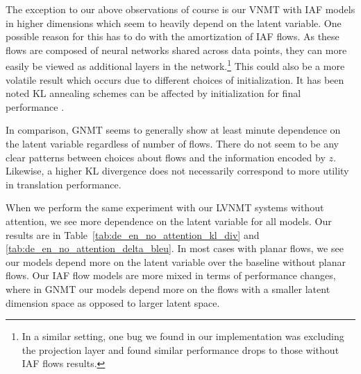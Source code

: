 The exception to our above observations of course is our \ac{VNMT} with \ac{IAF} models in higher dimensions which seem to heavily depend on the latent variable. One possible reason for this has to do with the amortization of \ac{IAF} flows. As these flows are composed of neural networks shared across data points, they can more easily be viewed as additional layers in the network.\footnote{In a similar setting, one bug we found in our implementation was excluding the projection layer and found similar performance drops to those without \ac{IAF} flows results.} This could also be a more volatile result which occurs due to different choices of initialization. It has been noted KL annealing schemes can be affected by initialization for final performance \cite{sphericallatent2018Xu}.

In comparison, \ac{GNMT} seems to generally show at least minute dependence on the latent variable regardless of number of flows. There do not seem to be any clear patterns between choices about flows and the information encoded by $z$. Likewise, a higher KL divergence does not necessarily correspond to more utility in translation performance.  

When we perform the same experiment with our \ac{LVNMT} systems without attention, we see more dependence on the latent variable for all models. Our results are in Table~\ref{tab:de_en_no_attention_kl_div} and \ref{tab:de_en_no_attention_delta_bleu}. In most cases with planar flows, we see our models depend more on the latent variable over the baseline without planar flows. Our \ac{IAF} flow models are more mixed in terms of performance changes, where in \ac{GNMT} our models depend more on the flows with a smaller latent dimension space as opposed to larger latent space. 

